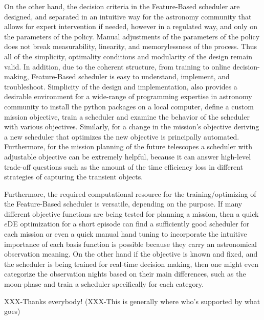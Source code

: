 \documentclass[12pt]{aastex62}
\theoremstyle{definition}
\begin{document}
On the other hand, the decision criteria in the Feature-Based scheduler are designed, and separated in an intuitive way for the astronomy community that allows for expert intervention if needed, however in a regulated way, and only on the parameters of the policy. Manual adjustments of the parameters of the policy does not break measurability, linearity, and memorylessness of the process. Thus all of the simplicity, optimality conditions and modularity of the design remain valid. In addition, due to the coherent structure, from training to online decision-making, Feature-Based scheduler is easy to understand, implement, and troubleshoot. Simplicity of the design and implementation, also provides a desirable environment for a wide-range of programming expertise in astronomy community to install the python packages on a local computer, define a custom mission objective, train a scheduler and examine the behavior of the scheduler with various objectives. Similarly, for a change in the mission's objective deriving a new scheduler that optimizes the new objective is principally automated. Furthermore, for the mission planning of the future telescopes a scheduler with adjustable objective can be extremely helpful, because it can answer high-level trade-off questions such as the amount of the time efficiency loss in different strategies of capturing the transient objects. 

Furthermore, the required computational resource for the training/optimizing of the Feature-Based scheduler is versatile, depending on the purpose. If many different objective functions are being tested for planning a mission, then a quick $e$DE optimization for a short episode can find a sufficiently good scheduler for each mission or even a quick manual hand tuning to incorporate the intuitive importance of each basis function is possible because they carry an astronomical observation meaning. On the other hand if the objective is known and fixed, and the scheduler is being trained for real-time decision making, then one might even categorize the observation nights based on their main differences, such as the moon-phase and train a scheduler specifically for each category. 


\acknowledgments
XXX-Thanks everybody! (XXX-This is generally where who's supported by what goes)



%
%

\end{document}
